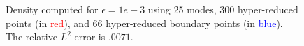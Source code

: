 \documentclass[preprint,10pt]{elsarticle}
\theoremstyle{definition}
\theoremstyle{lemma}
\theoremstyle{theorem}
\theoremstyle{assumption}
\begin{document}
\begin{figure}
\centering
\hspace{.1em}
\hspace{.1em}
\caption{Density computed for $\epsilon = 1e-3$ using 25 modes, 300 hyper-reduced points (in \textcolor{red}{red}), and 66 hyper-reduced boundary points (in \textcolor{blue}{blue}).  The relative $L^2$ error is $.0071$.}
\label{fig:pulse2d}
\end{figure}
\end{document}

